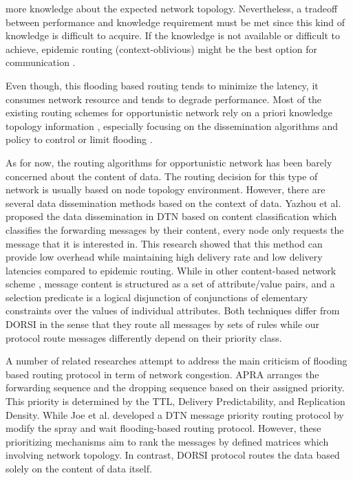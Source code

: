 more knowledge about the expected network topology. Nevertheless, a tradeoff between performance and knowledge requirement must be met since this kind of knowledge is difficult to acquire. If the knowledge is not available or difficult to achieve, epidemic routing (context-oblivious) might be the best option for communication \cite{bonaldo2011}.

Even though, this flooding based routing tends to minimize the latency, it consumes network resource and tends to degrade performance. Most of the existing routing schemes for opportunistic network rely on a priori knowledge topology information \cite{Pelusi2006}, especially focusing on the dissemination algorithms and policy to control or limit flooding \cite{Plymoth2010}.

As for now, the routing algorithms for opportunistic network has been barely concerned about the content of data. 
The routing decision for this type of network is usually based on node topology environment. 
However, there are several data dissemination methods based on the context of data. 
Yazhou et al. \cite{Jiao2009} proposed the data dissemination in DTN based on content classification which classifies the forwarding messages by their content, every node only requests the message that it is interested in. 
This research showed that this method can provide low overhead while maintaining high delivery rate and low delivery latencies compared to epidemic routing. 
While in other content-based network scheme \cite{Carzaniga2004}, message content is structured as a set of attribute/value pairs, and a selection predicate is a logical disjunction of conjunctions of elementary constraints over the values of individual attributes. 
Both techniques differ from DORSI in the sense that they route all messages by sets of rules while our protocol route messages differently depend on their priority class.

A number of related researches attempt to address the main criticism of flooding based routing protocol in term of network congestion. 
APRA \cite{Jin2009} arranges the forwarding sequence and the dropping sequence based on their assigned priority. 
This priority is determined by the TTL, Delivery Predictability, and Replication Density. 
While Joe et al. \cite{Joe2010} developed a DTN message priority routing protocol by modify the spray and wait \cite{Spyropoulos2005} flooding-based routing protocol. 
However, these prioritizing mechanisms aim to rank the messages by defined matrices which involving network topology. 
In contrast, DORSI protocol routes the data based solely on the content of data itself.


